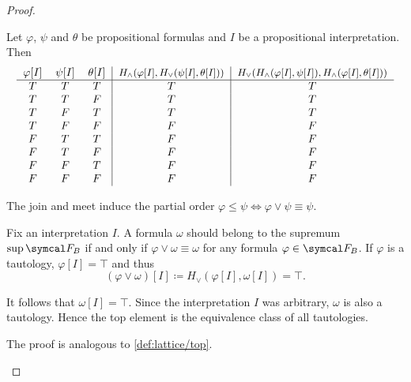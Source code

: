\begin{proof}
\begin{description}
     Let \( \varphi \), \( \psi \) and \( \theta \) be propositional formulas and \( I \) be a propositional interpretation. Then
    \begin{equation*}
      \begin{tabular}{c c c | c | c}
        \( \varphi[I] \) & \( \psi[I] \) & \( \theta[I] \) & \small{\( H_\land(\varphi[I], H_\lor(\psi[I], \theta[I])) \)} & \small{\( H_\lor(H_\land(\varphi[I], \psi[I]), H_\land(\varphi[I], \theta[I])) \)} \\
        \hline
        \( T \)          & \( T \)       & \( T \)         & \( T \)                                               & \( T \)    \\
        \( T \)          & \( T \)       & \( F \)         & \( T \)                                               & \( T \)    \\
        \( T \)          & \( F \)       & \( T \)         & \( T \)                                               & \( T \)    \\
        \( T \)          & \( F \)       & \( F \)         & \( F \)                                               & \( F \)    \\
        \( F \)          & \( T \)       & \( T \)         & \( F \)                                               & \( F \)    \\
        \( F \)          & \( T \)       & \( F \)         & \( F \)                                               & \( F \)    \\
        \( F \)          & \( F \)       & \( T \)         & \( F \)                                               & \( F \)    \\
        \( F \)          & \( F \)       & \( F \)         & \( F \)                                               & \( F \)
      \end{tabular}
    \end{equation*}
  \end{description}

  The join and meet induce the partial order \( \varphi \leq \psi \iff \varphi \lor \psi \equiv \psi \).

  \begin{description}
     Fix an interpretation \( I \). A formula \( \omega \) should belong to the supremum \( \sup \Cal{F}_B \) if and only if \( \varphi \lor \omega \equiv \omega \) for any formula \( \varphi \in \Cal{F}_B \). If \( \varphi \) is a tautology, \( \varphi[I] = \top \) and thus
    \begin{equation*}
      (\varphi \lor \omega)[I] \coloneqq H_\lor(\varphi[I], \omega[I]) = \top.
    \end{equation*}

    It follows that \( \omega[I] = \top \). Since the interpretation \( I \) was arbitrary, \( \omega \) is also a tautology. Hence the top element is the equivalence class of all tautologies.

     The proof is analogous to \ref{def:lattice/top}.
  \end{description}
\end{proof}


